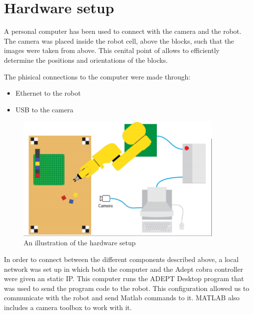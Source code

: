 \chapter{Hardware setup}\label{ch:hardware}
A personal computer has been used to connect with the camera and the robot. The camera was placed inside the robot cell, above the blocks, such that the images were taken from above. This cenital point of allows to efficiently determine the positions and orientations of the blocks. 

The phisical connections to the computer were made through: 
\begin{itemize}
	\item Ethernet to the robot  
	\item USB to the camera 
\end{itemize}

\begin{figure}[hb]
\centering
\includegraphics[width=4in]{figures/robotCellDesign.png}
\caption[robot Cell Design]
{An illustration of the hardware setup}
\end{figure}

In order to connect between the different components described above, a local network was set up in which both the computer and the Adept cobra controller were given an static IP. This computer runs the ADEPT Desktop program that was used to send the program code to the robot. This configuration allowed us to communicate with the robot and send Matlab commands to it. MATLAB also includes a camera toolbox to work with it. 
